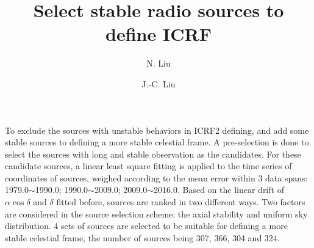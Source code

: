 \documentclass{aa}
\begin{document}
 


   \title{Select stable radio sources to define ICRF}

   \author{N. Liu
          \and
          J.-C. Liu}


 
  \abstract
   {}
   {To exclude the sources with unstable behaviors in ICRF2 defining, and add some stable sources to defining a more stable celestial frame. }
   {A pre-selection is done to select the sources with long and stable observation as the candidates. For these candidate sources, a linear least square fitting is applied to the time series of coordinates of sources, weighed according to the mean error within 3 data spans: 1979.0$\sim$1990.0; 1990.0$\sim$2009.0; 2009.0$\sim$2016.0. Based on the linear drift of $\alpha\cos\delta$ and $\delta$ fitted before, sources are ranked in two different ways. Two factors are considered in the source selection scheme: the axial stability and uniform sky distribution.}
   {4 sets of sources are selected to be suitable for defining a more stable celestial frame, the number of sources being 307, 366, 304 and 324.}
   {}


   \maketitle
   
%
\end{document}
